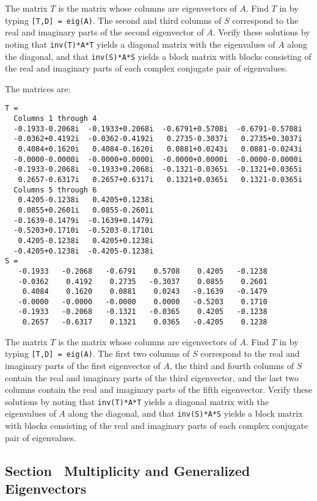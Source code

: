 \soln The matrix $T$ is the matrix whose columns are eigenvectors of $A$. 
Find $T$ in \Matlab by typing {\tt [T,D] = eig(A)}.  The second and third columns
of $S$ correspond to the real and imaginary parts of the second eigenvector
of $A$.  Verify these solutions by noting that
{\tt inv(T)*A*T} yields a diagonal matrix with the eigenvalues of $A$
along the diagonal, and that {\tt inv(S)*A*S} yields a block matrix
with blocks consisting of the real and imaginary parts of each complex
conjugate pair of eigenvalues.

\ans The matrices are:
\begin{verbatim}
T =
  Columns 1 through 4 
  -0.1933-0.2068i  -0.1933+0.2068i  -0.6791+0.5708i  -0.6791-0.5708i
  -0.0362+0.4192i  -0.0362-0.4192i   0.2735-0.3037i   0.2735+0.3037i
   0.4084+0.1620i   0.4084-0.1620i   0.0881+0.0243i   0.0881-0.0243i
  -0.0000-0.0000i  -0.0000+0.0000i  -0.0000+0.0000i  -0.0000-0.0000i
  -0.1933-0.2068i  -0.1933+0.2068i  -0.1321-0.0365i  -0.1321+0.0365i
   0.2657-0.6317i   0.2657+0.6317i   0.1321+0.0365i   0.1321-0.0365i
  Columns 5 through 6 
   0.4205-0.1238i   0.4205+0.1238i
   0.0855+0.2601i   0.0855-0.2601i
  -0.1639-0.1479i  -0.1639+0.1479i
  -0.5203+0.1710i  -0.5203-0.1710i
   0.4205-0.1238i   0.4205+0.1238i
  -0.4205+0.1238i  -0.4205-0.1238i
S =
   -0.1933   -0.2068   -0.6791    0.5708    0.4205   -0.1238
   -0.0362    0.4192    0.2735   -0.3037    0.0855    0.2601
    0.4084    0.1620    0.0881    0.0243   -0.1639   -0.1479
   -0.0000   -0.0000   -0.0000    0.0000   -0.5203    0.1710
   -0.1933   -0.2068   -0.1321   -0.0365    0.4205   -0.1238
    0.2657   -0.6317    0.1321    0.0365   -0.4205    0.1238
\end{verbatim}

\soln The matrix $T$ is the matrix whose columns are eigenvectors of $A$. 
Find $T$ in \Matlab by typing {\tt [T,D] = eig(A)}.  The first two columns
of $S$ correspond to the real and imaginary parts of the first eigenvector
of $A$, the third and fourth columns of $S$ contain the real and imaginary parts of 
the third eigenvector, and the last two columns contain the real and imaginary 
parts of the fifth eigenvector.  Verify these solutions by noting that
{\tt inv(T)*A*T} yields a diagonal matrix with the eigenvalues of $A$
along the diagonal, and that {\tt inv(S)*A*S} yields a block matrix
with blocks consisting of the real and imaginary parts of each complex
conjugate pair of eigenvalues.



\subsection*{Section~\protect{\ref{S:MGE}} Multiplicity and Generalized Eigenvectors}


